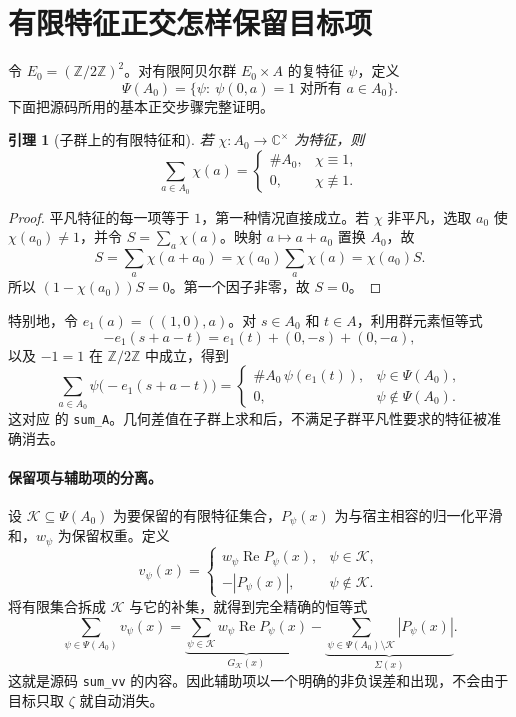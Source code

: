 \documentclass[UTF8,fontset=fandol,a4paper,openany,oneside]{ctexbook}
\newtheorem{lemma}[theorem]{引理}
\theoremstyle{definition}
\theoremstyle{remark}
\newcommand{\Rea}{\operatorname{Re}}
\begin{document}
\section{有限特征正交怎样保留目标项}
\label{sec:arith-orthogonality}
令 $E_0=(\mathbb Z/2\mathbb Z)^2$。对有限阿贝尔群 $E_0\times A$ 的复特征 $\psi$，定义
\[
\Psi(A_0)=\{\psi:\ \psi(0,a)=1\text{ 对所有 }a\in A_0\}.
\]
下面把源码所用的基本正交步骤完整证明。

\begin{lemma}[子群上的有限特征和]
若 $\chi:A_0\to\mathbb C^\times$ 为特征，则
\[
\sum_{a\in A_0}\chi(a)=
\begin{cases}
\#A_0,&\chi\equiv1,\\
0,&\chi\not\equiv1.
\end{cases}
\]
\end{lemma}
\begin{proof}
平凡特征的每一项等于 $1$，第一种情况直接成立。若 $\chi$ 非平凡，选取 $a_0$ 使 $\chi(a_0)\ne1$，并令 $S=\sum_a\chi(a)$。映射 $a\mapsto a+a_0$ 置换 $A_0$，故
\[
S=\sum_a\chi(a+a_0)=\chi(a_0)\sum_a\chi(a)=\chi(a_0)S.
\]
所以 $(1-\chi(a_0))S=0$。第一个因子非零，故 $S=0$。
\end{proof}

特别地，令 $e_1(a)=((1,0),a)$。对 $s\in A_0$ 和 $t\in A$，利用群元素恒等式
\[
-e_1(s+a-t)=e_1(t)+(0,-s)+(0,-a),
\]
以及 $-1=1$ 在 $\mathbb Z/2\mathbb Z$ 中成立，得到
\begin{equation}
\sum_{a\in A_0}\psi\bigl(-e_1(s+a-t)\bigr)
=
\begin{cases}
\#A_0\,\psi(e_1(t)),&\psi\in\Psi(A_0),\\
0,&\psi\notin\Psi(A_0).
\end{cases}
\label{eq:arith-character-projection}
\end{equation}
这对应  的 \texttt{sum\_A}。几何差值在子群上求和后，不满足子群平凡性要求的特征被准确消去。

\paragraph{保留项与辅助项的分离。}
设 $\mathcal K\subseteq\Psi(A_0)$ 为要保留的有限特征集合，$P_\psi(x)$ 为与宿主相容的归一化平滑和，$w_\psi$ 为保留权重。定义
\[
v_\psi(x)=
\begin{cases}
w_\psi\Rea P_\psi(x),&\psi\in\mathcal K,\\
-|P_\psi(x)|,&\psi\notin\mathcal K.
\end{cases}
\]
将有限集合拆成 $\mathcal K$ 与它的补集，就得到完全精确的恒等式
\begin{equation}
\sum_{\psi\in\Psi(A_0)}v_\psi(x)
=\underbrace{\sum_{\psi\in\mathcal K}w_\psi\Rea P_\psi(x)}_{G_{\mathcal K}(x)}
-\underbrace{\sum_{\psi\in\Psi(A_0)\setminus\mathcal K}|P_\psi(x)|}_{\Sigma(x)}.
\label{eq:arith-g-minus-sigma}
\end{equation}
这就是源码 \texttt{sum\_vv} 的内容。因此辅助项以一个明确的非负误差和出现，不会由于目标只取 $\zeta$ 就自动消失。
\end{document}
